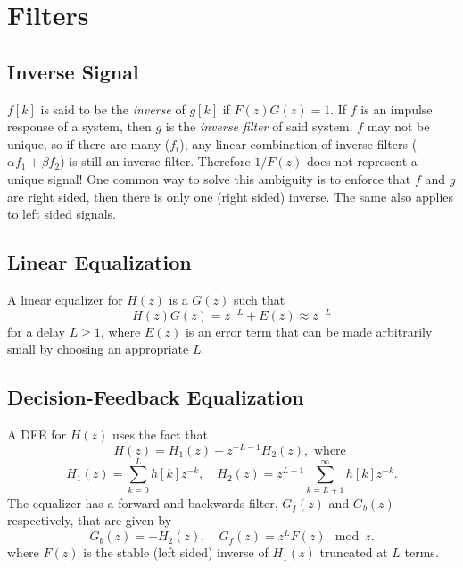 
\section{Filters}

\subsection{Inverse Signal}

$f[k]$ is said to be the \emph{inverse} of $g[k]$ if $F(z)G(z) = 1$.
If $f$ is an impulse response of a system, then $g$ is the \emph{inverse
filter} of said system. $f$ may not be unique, so if there are many ($f_i$),
any linear combination of inverse filters ($\alpha f_1 + \beta f_2$) is still
an inverse filter. Therefore $1/F(z)$ does not represent a unique signal! One
common way to solve this ambiguity is to enforce that $f$ and $g$ are right
sided, then there is only one (right sided) inverse. The same also applies to
left sided signals.


\subsection{Linear Equalization}

A linear equalizer for $H(z)$ is a $G(z)$ such that
\[
	H(z) G(z) = z^{-L} + E(z) \approx z^{-L}
\]
for a delay $L \geq 1$, where $E(z)$ is an error term that can be made
arbitrarily small by choosing an appropriate $L$.

\subsection{Decision-Feedback Equalization}

A DFE for $H(z)$ uses the fact that
\[
	H(z) = H_1(z) + z^{-L-1} H_2(z), \text{ where }
\]
\[
	H_1(z) = \sum_{k=0}^L h[k] z^{-k}, \quad
	H_2(z) = z^{L+1}\sum_{k=L+1}^\infty h[k] z^{-k}.
\]
The equalizer has a forward and backwards filter, $G_f(z)$ and $G_b(z)$
respectively, that are given by
\[
	G_b(z) = -H_2(z), \quad
	G_f(z) = z^L F(z) \mod z.
\]
where $F(z)$ is the stable (left sided) inverse of $H_1(z)$ truncated at $L$
terms.
